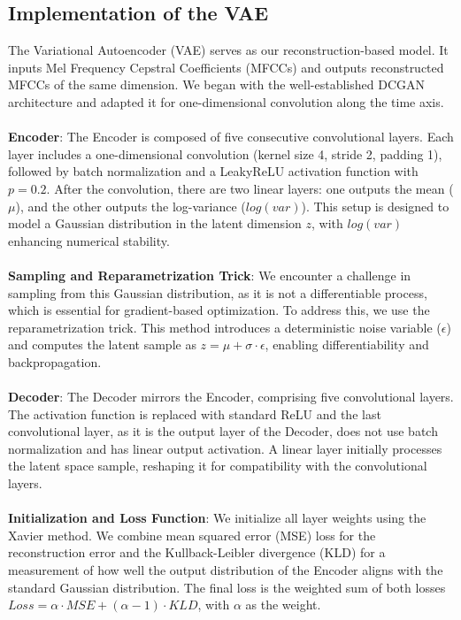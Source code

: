 \subsection{Implementation of the VAE}
The Variational Autoencoder (VAE) serves as our reconstruction-based model. It inputs Mel Frequency Cepstral Coefficients (MFCCs) and outputs reconstructed MFCCs of the same dimension. We began with the well-established DCGAN architecture and adapted it for one-dimensional convolution along the time axis.\\\\
\textbf{Encoder}: The Encoder is composed of five consecutive convolutional layers. Each layer includes a one-dimensional convolution (kernel size 4, stride 2, padding 1), followed by batch normalization and a LeakyReLU activation function with $p=0.2$. After the convolution, there are two linear layers: one outputs the mean ($\mu$), and the other outputs the log-variance ($log(var)$). This setup is designed to model a Gaussian distribution in the latent dimension $z$, with $log(var)$ enhancing numerical stability.\\\\
\textbf{Sampling and Reparametrization Trick}: We encounter a challenge in sampling from this Gaussian distribution, as it is not a differentiable process, which is essential for gradient-based optimization. To address this, we use the reparametrization trick. This method introduces a deterministic noise variable ($\epsilon$) and computes the latent sample as $z=\mu + \sigma \cdot \epsilon$, enabling differentiability and backpropagation.\\\\
\textbf{Decoder}: The Decoder mirrors the Encoder, comprising five convolutional layers. The activation function is replaced with standard ReLU and the last convolutional layer, as it is the output layer of the Decoder, does not use batch normalization and has linear output activation. A linear layer initially processes the latent space sample, reshaping it for compatibility with the convolutional layers.\\\\
\textbf{Initialization and Loss Function}: We initialize all layer weights using the Xavier method. We combine mean squared error (MSE) loss for the reconstruction error and the Kullback-Leibler divergence (KLD) for a measurement of how well the output distribution of the Encoder aligns with the standard Gaussian distribution. The final loss is the weighted sum of both losses $Loss=\alpha \cdot MSE + (\alpha - 1) \cdot KLD$, with $\alpha$ as the weight.

